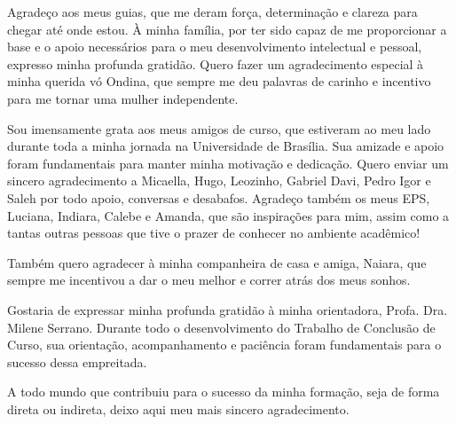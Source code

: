 \begin{agradecimentos}
    Agradeço aos meus guias, que me deram força, determinação e clareza para chegar até onde estou. À minha família, por ter sido capaz de me proporcionar a base e o apoio necessários para o meu desenvolvimento intelectual e pessoal, expresso minha profunda gratidão. Quero fazer um agradecimento especial à minha querida vó Ondina, que sempre me deu palavras de carinho e incentivo para me tornar uma mulher independente.

    Sou imensamente grata aos meus amigos de curso, que estiveram ao meu lado durante toda a minha jornada na Universidade de Brasília. Sua amizade e apoio foram fundamentais para manter minha motivação e dedicação. Quero enviar um sincero agradecimento a Micaella, Hugo, Leozinho, Gabriel Davi, Pedro Igor e Saleh por todo apoio, conversas e desabafos. Agradeço também os meus EPS, Luciana, Indiara, Calebe e Amanda, que são inspirações para mim, assim como a tantas outras pessoas que tive o prazer de conhecer no ambiente acadêmico!
    
    Também quero agradecer à minha companheira de casa e amiga, Naiara, que sempre me incentivou a dar o meu melhor e correr atrás dos meus sonhos.
    
    Gostaria de expressar minha profunda gratidão à minha orientadora, Profa. Dra. Milene Serrano. Durante todo o desenvolvimento do Trabalho de Conclusão de Curso, sua orientação, acompanhamento e paciência foram fundamentais para o sucesso dessa empreitada.
    
    A todo mundo que contribuiu para o sucesso da minha formação, seja de forma direta ou indireta, deixo aqui meu mais sincero agradecimento.
\end{agradecimentos}
